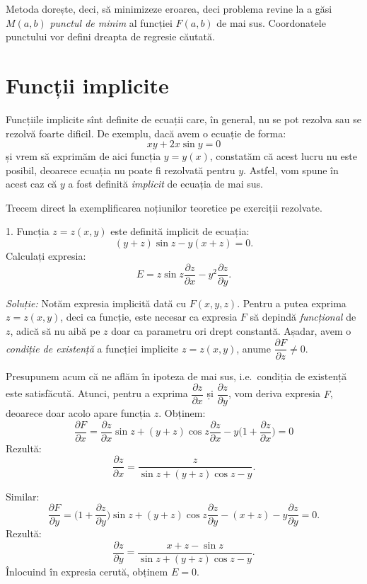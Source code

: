 Metoda dorește, deci, să minimizeze eroarea, deci problema revine la a găsi
$ M(a, b) $ \emph{punctul de minim} al funcției $ F(a, b) $ de mai sus.
Coordonatele punctului vor defini dreapta de regresie căutată.

\section{Funcții implicite}


Funcțiile implicite sînt definite de ecuații care, în general, nu se pot
rezolva sau se rezolvă foarte dificil. De exemplu, dacă avem o ecuație
de forma:
\[
  xy + 2x\sin y = 0
\]
și vrem să exprimăm de aici funcția $ y = y(x) $, constatăm că acest
lucru nu este posibil, deoarece ecuația nu poate fi rezolvată pentru $ y $.
Astfel, vom spune în acest caz că $ y $ a fost definită \emph{implicit}
de ecuația de mai sus.

Trecem direct la exemplificarea noțiunilor teoretice pe exerciții rezolvate.

\vspace{0.5cm}

1. Funcția $ z = z(x, y) $ este definită implicit de ecuația:
\[
  (y + z) \sin z - y (x + z) = 0.
\]
Calculați expresia:
\[
  E = z \sin z \frac{\partial z}{\partial x} - y^2 \frac{\partial z}{\partial y}.
\]

\emph{Soluție:} Notăm expresia implicită dată cu $ F(x, y, z) $. Pentru a putea
exprima $ z = z(x, y) $, deci ca funcție, este necesar ca expresia $ F $ să depindă
\emph{funcțional} de $ z $, adică să nu aibă pe $ z $ doar ca parametru ori drept
constantă. Așadar, avem o \emph{condiție de existență} a funcției implicite
$ z = z(x, y) $, anume $ \dfrac{\partial F}{\partial z} \neq 0 $.

Presupunem acum că ne aflăm în ipoteza de mai sus, i.e.\ condiția de existență
este satisfăcută. Atunci, pentru a exprima $ \dfrac{\partial z}{\partial x} $
și $ \dfrac{\partial z}{\partial y} $, vom deriva expresia $ F $, deoarece
doar acolo apare funcția $ z $. Obținem:
\[
  \frac{\partial F}{\partial x} = \frac{\partial z}{\partial x} \sin z + %
  (y + z) \cos z \dfrac{\partial z}{\partial x} - %
  y\Big(1 + \dfrac{\partial z}{\partial x} \Big) = 0
\]
Rezultă:
\[
  \frac{\partial z}{\partial x} = \frac{z}{\sin z + (y + z) \cos z - y}.
\]

Similar:
\[
  \frac{\partial F}{\partial y} = \Big(1 + \frac{\partial z}{\partial y} \Big) \sin z + %
  (y + z) \cos z \frac{\partial z}{\partial y} - (x + z) - y \frac{\partial z}{\partial y} = 0.
\]
Rezultă:
\[
  \frac{\partial z}{\partial y} = \dfrac{x + z - \sin z}{\sin z + (y + z)\cos z - y}.
\]
Înlocuind în expresia cerută, obținem $ E = 0 $.

